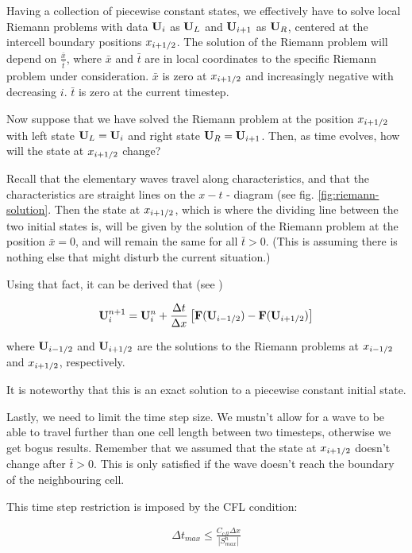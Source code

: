 Having a collection of piecewise constant states, we effectively have to solve local Riemann problems with data $\mathbf{U}_i$ as $\mathbf{U}_L$ and $\mathbf{U}_{i+1}$ as $\mathbf{U}_R$, centered at the intercell boundary positions $x_{i+1/2}$.
The solution of the Riemann problem will depend on $\frac{\bar{x}}{\bar{t}}$, where $\bar{x}$ and $\bar{t}$ are in local coordinates to the specific Riemann problem under consideration. 
$\bar{x}$ is zero at $x_{i+1/2}$ and increasingly negative with decreasing $i$.
$\bar{t}$ is zero at the current timestep.


Now suppose that we have solved the Riemann problem at the position $x_{i+1/2}$ with left state $\mathbf{U}_L = \mathbf{U}_i$ and right state $\mathbf{U}_R = \mathbf{U}_{i+1}$.
Then, as time evolves, how will the state at $x_{i+1/2}$ change?

Recall that the elementary waves travel along characteristics, and that the characteristics are straight lines on the $x-t$ - diagram (see fig. \ref{fig:riemann-solution}.
Then the state at $x_{i+1/2}$, which is where the dividing line between the two initial states is, will be given by the solution of the Riemann problem at the position $\bar{x} = 0$, and will remain the same for all $\bar{t} > 0$.
(This is assuming there is nothing else that might disturb the current situation.)


Using that fact, it can be derived that (see \cite{toro}) 

\begin{align}
	\mathbf{U}^{n+1}_i = \mathbf{U}^n_i + \frac{\Delta t}{\Delta x} \left[\mathbf{F}(\mathbf{U}_{i-1/2}) - \mathbf{F}(\mathbf{U}_{i+1/2}) \right] \label{eq:godunov-discretized}
\end{align}

where $\mathbf{U}_{i-1/2}$ and $\mathbf{U}_{i+1/2}$ are the solutions to the Riemann problems at $x_{i-1/2}$ and $x_{i+1/2}$, respectively.


It is noteworthy that this is an exact solution to a piecewise constant initial state.




Lastly, we need to limit the time step size.
We mustn't allow for a wave to be able to travel further than one cell length between two timesteps, otherwise we get bogus results.
Remember that we assumed that the state at $x_{i+1/2}$ doesn't change after $\bar{t} > 0$.
This is only satisfied if the wave doesn't reach the boundary of the neighbouring cell.

This time step restriction is imposed by the CFL condition:

\begin{align}
	\Delta t_{max} \leq \frac{C_{cfl} \Delta x}{|S_{max}^n|} \label{eq:godunov-cfl}
\end{align}


